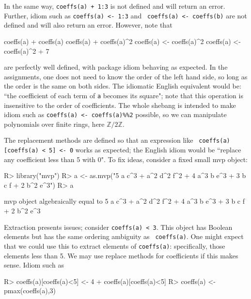 \documentclass{article}
\begin{document}
In the same way, {\tt coeffs(a) + 1:3} is not defined and will return
an error.  Further, idiom such as {\tt coeffs(a) <- 1:3} and {\tt
coeffs(a) <- coeffs(b)} are not defined and will also return an error.
However, note that

\begin{Schunk}
\begin{Sinput}
coeffs(a) + coeffs(a)
coeffs(a) + coeffs(a)^2
coeffs(a) <- coeffs(a)^2
coeffs(a) <- coeffs(a)^2 + 7
\end{Sinput}
\end{Schunk}


are perfectly well defined, with package idiom behaving as expected.
In the assignments, one does not need to know the order of the left
hand side, so long as the order is the same on both sides.  The
idiomatic English equivalent would be: ``the coefficient of each term
of {\tt a} becomes its square"; note that this operation is
insensitive to the order of coefficients.  The whole shebang is
intended to make idiom such as {\tt coeffs(a) <- coeffs(a)\%\%2}
possible, so we can manipulate polynomials over finite rings, here
$\mathbb{Z}/2\mathbb{Z}$.

The replacement methods are defined so that an expression like {\tt
coeffs(a)[coeffs(a) < 5] <- 0} works as expected; the English idiom
would be ``replace any coefficient less than 5 with 0".  To fix ideas,
consider a fixed small mvp object:

\begin{Schunk}
\begin{Sinput}
R> library("mvp")
R> a <- as.mvp("5 a c^3 + a^2 d^2 f^2 + 4 a^3 b e^3 + 3 b c f + 2 b^2 e^3")
R> a
\end{Sinput}
\begin{Soutput}
mvp object algebraically equal to
5 a c^3  +  a^2 d^2 f^2  +  4 a^3 b e^3  +  3 b c f  +  2 b^2 e^3
\end{Soutput}
\end{Schunk}

Extraction presents issues; consider {\tt coeffs(a) < 3}.  This object
has Boolean elements but has the same ordering ambiguity as {\tt
coeffs(a)}.  One might expect that we could use this to extract
elements of {\tt coeffs(a)}: specifically, those elements less than 5.
We may use replace methods for coefficients if this makes sense.
Idiom such as

\begin{Schunk}
\begin{Sinput}
R> coeffs(a)[coeffs(a)<5] <- 4 + coeffs(a)[coeffs(a)<5]
R> coeffs(a) <- pmax(coeffs(a),3)
\end{Sinput}
\end{Schunk}
\end{document}
